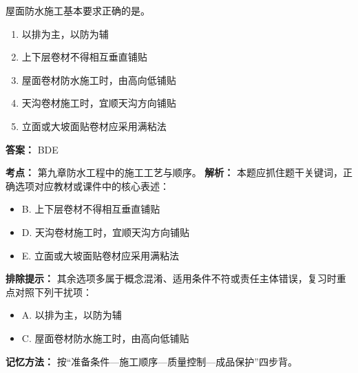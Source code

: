 \documentclass[UTF8,fontset=fandol,11pt]{ctexart}
\begin{document}
\begin{quizbox}[title={第 2 题}]
屋面防水施工基本要求正确的是。\\
\begin{enumerate}[label=\Alph*.]
\item 以排为主，以防为辅
\item 上下层卷材不得相互垂直铺贴
\item 屋面卷材防水施工时，由高向低铺贴
\item 天沟卷材施工时，宜顺天沟方向铺贴
\item 立面或大坡面贴卷材应采用满粘法
\end{enumerate}
\textbf{答案：} BDE
\vspace{0.25em}
\begin{answerbox}[title={考点解析}]
\textbf{考点：} 第九章防水工程中的施工工艺与顺序。
\textbf{解析：} 本题应抓住题干关键词，正确选项对应教材或课件中的核心表述：
\begin{itemize}
\item B. 上下层卷材不得相互垂直铺贴
\item D. 天沟卷材施工时，宜顺天沟方向铺贴
\item E. 立面或大坡面贴卷材应采用满粘法
\end{itemize}
\textbf{排除提示：} 其余选项多属于概念混淆、适用条件不符或责任主体错误，复习时重点对照下列干扰项：
\begin{itemize}
\item A. 以排为主，以防为辅
\item C. 屋面卷材防水施工时，由高向低铺贴
\end{itemize}
\textbf{记忆方法：} 按“准备条件—施工顺序—质量控制—成品保护”四步背。
\end{answerbox}
\end{quizbox}

\vspace{0.2em}
\end{document}
